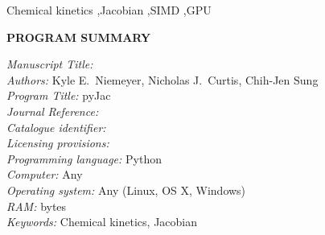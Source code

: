 \documentclass[preprint,12pt]{elsarticle}
\newcounter{bla}
\begin{document}
\begin{frontmatter}
\begin{keyword}
Chemical kinetics \sep Jacobian \sep SIMD \sep GPU
\end{keyword}

\end{frontmatter}





{\bf PROGRAM SUMMARY}

\begin{small}
\noindent
{\em Manuscript Title:}                                       \\
{\em Authors:} Kyle E.\ Niemeyer, Nicholas J.\ Curtis, Chih-Jen Sung \\
{\em Program Title:} pyJac                                    \\
{\em Journal Reference:}                                      \\
{\em Catalogue identifier:}                                   \\
{\em Licensing provisions:}                                   \\
{\em Programming language:} Python                            \\
{\em Computer:} Any                                              \\
{\em Operating system:} Any (Linux, OS X, Windows)            \\
{\em RAM:} bytes                                              \\
{\em Keywords:} Chemical kinetics, Jacobian  \\

\end{small}
\end{document}
